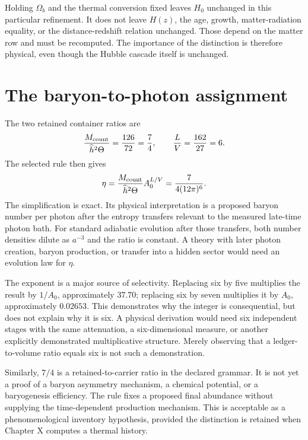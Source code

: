 Holding $\Omega_b$ and the thermal conversion fixed leaves $H_0$ unchanged in this particular refinement. It does not leave $H(z)$, the age, growth, matter-radiation equality, or the distance-redshift relation unchanged. Those depend on the matter row and must be recomputed. The importance of the distinction is therefore physical, even though the Hubble cascade itself is unchanged.

\section{The baryon-to-photon assignment}
The two retained container ratios are
\begin{equation}
 \frac{M_{\rm count}}{\widehat h^2\Theta}=\frac{126}{72}=\frac74,
 \qquad \frac LV=\frac{162}{27}=6.
 \label{c8:ratios}
\end{equation}
The selected rule then gives
\begin{equation}
 \eta=\frac{M_{\rm count}}{\widehat h^2\Theta}
       A_0^{L/V}=\frac7{4(12\pi)^6}.
 \label{c8:etacontainers}
\end{equation}
The simplification is exact. Its physical interpretation is a proposed baryon number per photon after the entropy transfers relevant to the measured late-time photon bath. For standard adiabatic evolution after those transfers, both number densities dilute as $a^{-3}$ and the ratio is constant. A theory with later photon creation, baryon production, or transfer into a hidden sector would need an evolution law for $\eta$.

The exponent is a major source of selectivity. Replacing six by five multiplies the result by $1/A_0$, approximately $37.70$; replacing six by seven multiplies it by $A_0$, approximately $0.02653$. This demonstrates why the integer is consequential, but does not explain why it is six. A physical derivation would need six independent stages with the same attenuation, a six-dimensional measure, or another explicitly demonstrated multiplicative structure. Merely observing that a ledger-to-volume ratio equals six is not such a demonstration.

Similarly, $7/4$ is a retained-to-carrier ratio in the declared grammar. It is not yet a proof of a baryon asymmetry mechanism, a chemical potential, or a baryogenesis efficiency. The rule fixes a proposed final abundance without supplying the time-dependent production mechanism. This is acceptable as a phenomenological inventory hypothesis, provided the distinction is retained when Chapter X computes a thermal history.

